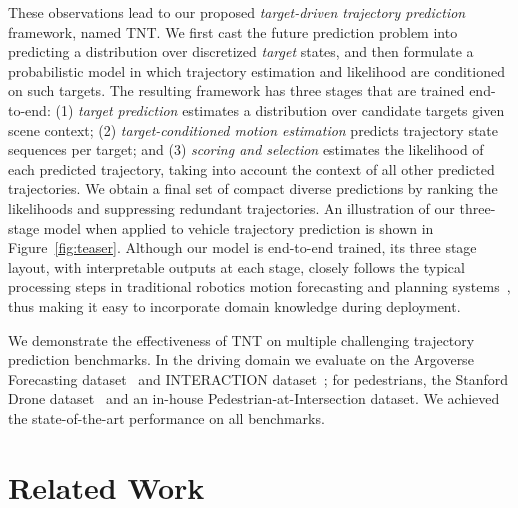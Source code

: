 \documentclass{article}
\newcommand{\model}{TNT\xspace}
\begin{document}
These observations lead to our proposed \textit{target-driven trajectory prediction} framework, named \model. We first cast the future prediction problem into predicting a distribution over discretized {\em target} states, and then formulate a probabilistic model in which trajectory estimation and likelihood are conditioned on such targets. The resulting framework has three stages that are trained end-to-end: 
(1) {\em target prediction} estimates a distribution over candidate targets given scene context; 
(2) {\em target-conditioned motion estimation} predicts trajectory state sequences per target; and 
(3) {\em scoring and selection} estimates the likelihood of each predicted trajectory, taking into account the context of all other predicted trajectories. We obtain a final set of compact diverse predictions by ranking the likelihoods and suppressing redundant trajectories.
An illustration of our three-stage model when applied to vehicle trajectory prediction is shown in Figure~\ref{fig:teaser}. Although our model is end-to-end trained, its three stage layout, with interpretable outputs at each stage,  closely follows the typical processing steps in traditional robotics motion forecasting and planning systems~\cite{tsubouchi1994behavior,broadhurst2004prediction}, thus making it easy to incorporate domain knowledge during deployment.

We demonstrate the effectiveness of \model on multiple challenging trajectory prediction benchmarks. In the driving domain we evaluate on the Argoverse Forecasting dataset~\cite{chang2019argoverse} and INTERACTION dataset~\cite{interactiondataset}; for pedestrians, the Stanford Drone dataset~\cite{stanford_drone_dataset} and an in-house Pedestrian-at-Intersection dataset. We achieved the state-of-the-art performance on all benchmarks.


     \section{Related Work}
\end{document}
